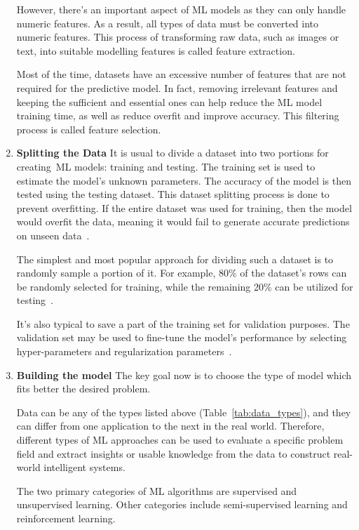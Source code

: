 \begin{enumerate}
    However, there's an important aspect of \gls{ML} models as they can only handle numeric features. As a result, all types of data must be converted into numeric features. This process of transforming raw data, such as images or text, into suitable modelling features is called feature extraction.
    
    Most of the time, datasets have an excessive number of features that are not required for the predictive model. In fact, removing irrelevant features and keeping the sufficient and essential ones can help reduce the ML model training time, as well as reduce overfit and improve accuracy. This filtering process is called feature selection.
    
    \item \textbf{Splitting the Data} It is usual to divide a dataset into two portions for creating \gls{ML} models: training and testing. The training set is used to estimate the model's unknown parameters. The accuracy of the model is then tested using the testing dataset. This dataset splitting process is done to prevent overfitting. If the entire dataset was used for training, then the model would overfit the data, meaning it would fail to generate accurate predictions on unseen data~\cite{Joseph2020SPlit:Splitting}.
    
    The simplest and most popular approach for dividing such a dataset is to randomly sample a portion of it. For example, 80\% of the dataset's rows can be randomly selected for training, while the remaining 20\% can be utilized for testing~\cite{Joseph2020SPlit:Splitting}.
    
    It's also typical to save a part of the training set for validation purposes. The validation set may be used to fine-tune the model's performance by selecting hyper-parameters and regularization parameters~\cite{Joseph2020SPlit:Splitting}.
    
    \item \textbf{Building the model} The key goal now is to choose the type of model which fits better the desired problem.
    
    Data can be any of the types listed above (Table~\ref{tab:data_types}), and they can differ from one application to the next in the real world. Therefore, different types of \gls{ML} approaches can be used to evaluate a specific problem field and extract insights or usable knowledge from the data to construct real-world intelligent systems.
    
    The two primary categories of \gls{ML} algorithms are supervised and unsupervised learning. Other categories include semi-supervised learning and reinforcement learning.
    

\end{enumerate}
